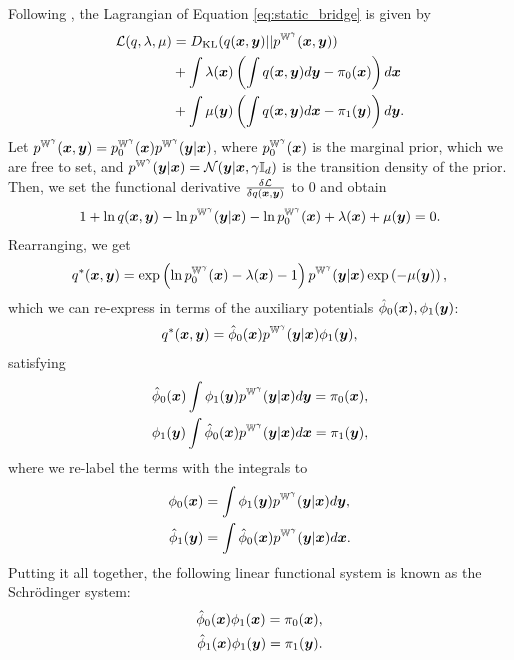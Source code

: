 \documentclass[a4paper,12pt,twoside,openright]{report}
\theoremstyle{definition}
\begin{document}
Following \cite{pavon2018data}, the Lagrangian of Equation \ref{eq:static_bridge} is given by
\begin{align}\label{eq:schro_lagrangian}
    {\mathcal{L}}(q, \lambda,  \mu) &=  D_{\mathrm{KL}} (q({\bm{x}},{\bm{y}})  || p^{\mathbb{W}^{\gamma}}({\bm{x}},{\bm{y}}))  \nonumber\\
    &+ \int \lambda({\bm{x}})\left( \int q({\bm{x}},{\bm{y}})d{\bm{y}} -\pi_0({\bm{x}})\right)d{\bm{x}} \nonumber \\
    &+ \int \mu({\bm{y}}) \left(\int q({\bm{x}},{\bm{y}}) d{\bm{x}} - \pi_1({\bm{y}})\right) d{\bm{y}}.
\end{align}
Let $p^{\mathbb{W}^{\gamma}}({\bm{x}},{\bm{y}}) = p^{\mathbb{W}^{\gamma}}_0({\bm{x}})p^{\mathbb{W}^{\gamma}}({\bm{y}}|{\bm{x}})$, where $p^{\mathbb{W}^{\gamma}}_0({\bm{x}})$ is the marginal prior, which we are free to set, and $p^{\mathbb{W}^{\gamma}}({\bm{y}}|{\bm{x}})={\mathcal{N}}({\bm{y}} | {\bm{x}}, \gamma{\mathbb{I}_d})$ is the transition density of the prior. Then, we set the functional derivative $\frac{\delta {\mathcal{L}}}{\delta q({\bm{x}}, {\bm{y}})}$ to 0 and obtain
\begin{align*}
    1 + \ln q({\bm{x}}, {\bm{y}})  - \ln p^{\mathbb{W}^{\gamma}}({\bm{y}}|{\bm{x}})
    - \ln p^{\mathbb{W}^{\gamma}}_0({\bm{x}})+ \lambda({\bm{x}})
+ \mu({\bm{y}}) = 0. \nonumber
\end{align*}
Rearranging, we get
\begin{align*}
{q^{*}({\bm{x}}, {\bm{y}}) }  = \exp\left(  \ln p^{\mathbb{W}^{\gamma}}_0({\bm{x}}) -\lambda({\bm{x}}) -1\right)p^{\mathbb{W}^{\gamma}}({\bm{y}}|{\bm{x}})\exp\left(- \mu({\bm{y}})\right) ,\nonumber
\end{align*}
which we can re-express in terms of the auxiliary potentials ${\hat{\phi}}_0({\bm{x}}), \phi_1({\bm{y}})$:
\begin{align*}
{q^{*}({\bm{x}}, {\bm{y}}) }  = {\hat{\phi}}_0({\bm{x}})p^{\mathbb{W}^{\gamma}}({\bm{y}}|{\bm{x}})\phi_1({\bm{y}}), \nonumber
\end{align*}
satisfying
\begin{align}
    {\hat{\phi}}_0({\bm{x}}) \int \phi_1({\bm{y}}) p^{\mathbb{W}^{\gamma}}({\bm{y}}|{\bm{x}}) d{\bm{y}} = \pi_0({\bm{x}}) , \nonumber\\ 
    \phi_1({\bm{y}}) \int {\hat{\phi}}_0({\bm{x}}) p^{\mathbb{W}^{\gamma}}({\bm{y}}|{\bm{x}}) d{\bm{x}} = \pi_1({\bm{y}}), \nonumber
\end{align}
where we re-label the terms with the integrals to
\begin{align} \label{eq:sysint}
    \phi_0({\bm{x}}) &= \int \phi_1({\bm{y}}) p^{\mathbb{W}^{\gamma}}({\bm{y}}|{\bm{x}}) d{\bm{y}}, \nonumber\\ 
    {\hat{\phi}}_1({\bm{y}}) &= \int {\hat{\phi}}_0({\bm{x}}) p^{\mathbb{W}^{\gamma}}({\bm{y}}|{\bm{x}}) d{\bm{x}}. \nonumber
\end{align}
Putting it all together, the following linear functional system is known as the Schrödinger system:
\begin{align}
    {\hat{\phi}}_0({\bm{x}}) \phi_1({\bm{x}})  = \pi_0({\bm{x}}),  \nonumber \\ 
    {\hat{\phi}}_1({\bm{x}}) \phi_1({\bm{y}})  = \pi_1({\bm{y}}).
\end{align}
\end{document}
